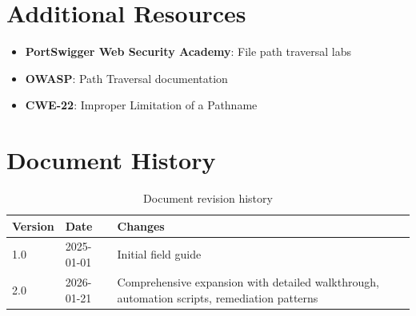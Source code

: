 \documentclass[11pt,letterpaper]{article}
\begin{document}
\section{Additional Resources}

\begin{itemize}
  \item \textbf{PortSwigger Web Security Academy}: File path traversal labs
  \item \textbf{OWASP}: Path Traversal documentation
  \item \textbf{CWE-22}: Improper Limitation of a Pathname
\end{itemize}

\section{Document History}

\begin{table}[h]
\centering
\begin{tabular}{@{}llp{8cm}@{}}
\toprule
\textbf{Version} & \textbf{Date} & \textbf{Changes} \\
\midrule
1.0 & 2025-01-01 & Initial field guide \\
2.0 & 2026-01-21 & Comprehensive expansion with detailed walkthrough, automation scripts, remediation patterns \\
\bottomrule
\end{tabular}
\caption{Document revision history}
\end{table}
\end{document}
